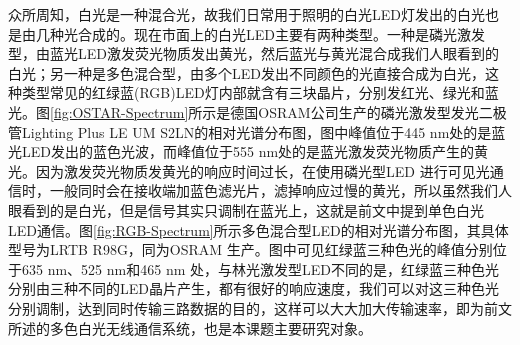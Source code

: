 众所周知，白光是一种混合光，故我们日常用于照明的白光LED灯发出的白光也是由几种光合成的。现在市面上的白光LED主要有两种类型。一种是磷光激发型，由蓝光LED激发荧光物质发出黄光，然后蓝光与黄光混合成我们人眼看到的白光；另一种是多色混合型，由多个LED发出不同颜色的光直接合成为白光，这种类型常见的红绿蓝(RGB)LED灯内部就含有三块晶片，分别发红光、绿光和蓝光。图\ref{fig:OSTAR-Spectrum}所示是德国OSRAM公司生产的磷光激发型发光二极管Lighting Plus LE UM S2LN的相对光谱分布图\cite{LE2011}，图中峰值位于445 nm处的是蓝光LED发出的蓝色光波，而峰值位于555 nm处的是蓝光激发荧光物质产生的黄光。因为激发荧光物质发黄光的响应时间过长，在使用磷光型LED 进行可见光通信时，一般同时会在接收端加蓝色滤光片，滤掉响应过慢的黄光，所以虽然我们人眼看到的是白光，但是信号其实只调制在蓝光上，这就是前文中提到单色白光LED通信。图\ref{fig:RGB-Spectrum}所示多色混合型LED的相对光谱分布图\citep{LRTB2011}，其具体型号为LRTB R98G，同为OSRAM 生产。图中可见红绿蓝三种色光的峰值分别位于635 nm、525 nm和465 nm 处，与林光激发型LED不同的是，红绿蓝三种色光分别由三种不同的LED晶片产生，都有很好的响应速度，我们可以对这三种色光分别调制，达到同时传输三路数据的目的，这样可以大大加大传输速率，即为前文所述的多色白光无线通信系统，也是本课题主要研究对象。


